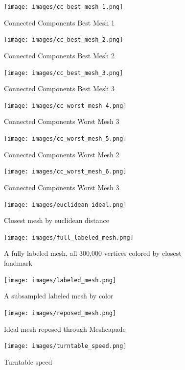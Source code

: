\begin{figure}[!htb]
        \caption{Connected Components Best Mesh 1}
        \centering
        \texttt{[image: images/cc\_best\_mesh\_1.png]}
\end{figure}
\begin{figure}[!htb]
        \caption{Connected Components Best Mesh 2}
        \centering
        \texttt{[image: images/cc\_best\_mesh\_2.png]}
\end{figure}
\begin{figure}[!htb]
        \caption{Connected Components Best Mesh 3}
        \centering
        \texttt{[image: images/cc\_best\_mesh\_3.png]}
\end{figure}

\begin{figure}[!htb]
        \caption{Connected Components Worst  Mesh 3}
        \centering
        \texttt{[image: images/cc\_worst\_mesh\_4.png]}
\end{figure}

\begin{figure}[!htb]
        \caption{Connected Components Worst  Mesh 2}
        \centering
        \texttt{[image: images/cc\_worst\_mesh\_5.png]}
\end{figure}

\begin{figure}[!htb]
        \caption{Connected Components Worst  Mesh 3}
        \centering
        \texttt{[image: images/cc\_worst\_mesh\_6.png]}
\end{figure}

\begin{figure}[!htb]
        \caption{Closest mesh by euclidean distance}
        \centering
        \texttt{[image: images/euclidean\_ideal.png]}
\end{figure}

\begin{figure}[!htb]
        \caption{A fully labeled mesh, all 300,000 vertices colored by closest landmark}
        \centering
        \texttt{[image: images/full\_labeled\_mesh.png]}
\end{figure}

\begin{figure}[!htb]
        \caption{A subsampled labeled mesh by color}
        \centering
        \texttt{[image: images/labeled\_mesh.png]}
\end{figure}

\begin{figure}[!htb]
        \caption{Ideal mesh reposed through Meshcapade}
        \centering
        \texttt{[image: images/reposed\_mesh.png]}
\end{figure}

\begin{figure}[!htb]
        \caption{Turntable speed}
        \centering
        \texttt{[image: images/turntable\_speed.png]}
\end{figure}


